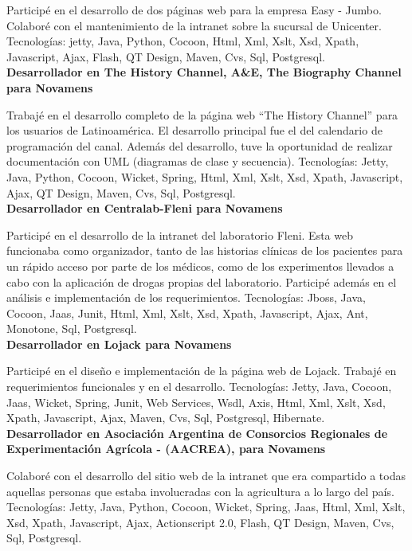 \documentclass[a4paper,11pt]{article}
\begin{document}
\noindent Participé en el desarrollo de dos páginas web para la empresa Easy -
Jumbo.  Colaboré con el mantenimiento de la intranet sobre la sucursal de
Unicenter.
Tecnologías: jetty, Java, Python, Cocoon, Html, Xml, Xslt, Xsd, Xpath,
Javascript, Ajax, Flash, QT Design, Maven, Cvs, Sql, Postgresql. \\

\noindent \textbf{Desarrollador en The History Channel, A\&E, The Biography
Channel para Novamens}

\noindent Trabajé en el desarrollo completo de la página web “The History
Channel” para los usuarios de Latinoamérica. El desarrollo principal fue el del
calendario de programación del canal.  Además del desarrollo, tuve la
oportunidad de realizar documentación con UML (diagramas de clase y secuencia).
Tecnologías: Jetty, Java, Python, Cocoon, Wicket, Spring, Html, Xml, Xslt, Xsd,
Xpath, Javascript, Ajax, QT Design, Maven, Cvs, Sql, Postgresql. \\

\noindent \textbf{Desarrollador en Centralab-Fleni para Novamens}

\noindent Participé en el desarrollo de la intranet del laboratorio Fleni. Esta
web funcionaba como organizador, tanto de las historias clínicas de los
pacientes para un rápido acceso por parte de los médicos, como de los
experimentos llevados a cabo con la aplicación de drogas propias del
laboratorio. Participé además en el análisis e implementación de los
requerimientos.  Tecnologías: Jboss, Java, Cocoon, Jaas, Junit, Html, Xml,
Xslt, Xsd, Xpath, Javascript, Ajax, Ant, Monotone, Sql, Postgresql. \\

\noindent \textbf{Desarrollador en Lojack para Novamens}

\noindent Participé en el diseño e implementación de la página web de Lojack.
Trabajé en requerimientos funcionales y en el desarrollo.  Tecnologías: Jetty,
Java, Cocoon, Jaas, Wicket, Spring, Junit, Web Services, Wsdl, Axis, Html, Xml,
Xslt, Xsd, Xpath, Javascript, Ajax, Maven, Cvs, Sql, Postgresql, Hibernate. \\

\noindent \textbf{Desarrollador en Asociación Argentina de Consorcios
Regionales de Experimentación Agrícola - (AACREA), para Novamens}

\noindent Colaboré con el desarrollo del sitio web de la intranet que era
compartido a todas aquellas personas que estaba involucradas con la agricultura
a lo largo del país.  Tecnologías: Jetty, Java, Python, Cocoon, Wicket, Spring,
Jaas, Html, Xml, Xslt, Xsd, Xpath, Javascript, Ajax, Actionscript 2.0, Flash,
QT Design, Maven, Cvs, Sql, Postgresql. \\
\end{document}
